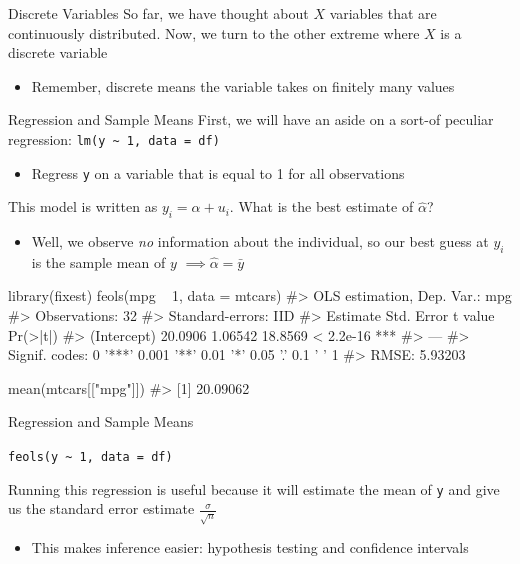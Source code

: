 \documentclass[aspectratio=169,t,11pt,table]{beamer}
\begin{document}
\begin{frame}{Discrete Variables}
  So far, we have thought about $X$ variables that are continuously distributed. Now, we turn to the other extreme where $X$ is a discrete variable
  \begin{itemize}
    \item Remember, \alert{discrete} means the variable takes on finitely many values
  \end{itemize}
\end{frame}

\begin{frame}{Regression and Sample Means}
    First, we will have an aside on a sort-of peculiar regression: 
    \texttt{lm(y \textasciitilde{} 1, data = df)}
    \begin{itemize}
      \item Regress \texttt{y} on a variable that is equal to 1 for all observations
    \end{itemize}

    \pause
    \bigskip
    This model is written as $y_i = \alpha + u_i$. What is the best estimate of $\hat{\alpha}$?
    \begin{itemize}
      \item Well, we observe \emph{no} information about the individual, so our best guess at $y_i$ is the sample mean of $y$ $\implies \hat{\alpha} = \bar{y}$
    \end{itemize} 
\end{frame}

\begin{frame}[fragile]{}
  \begin{codeblock}
library(fixest)
feols(mpg ~ 1, data = mtcars)
#> OLS estimation, Dep. Var.: mpg
#> Observations: 32
#> Standard-errors: IID 
#>             Estimate Std. Error t value  Pr(>|t|)    
#> (Intercept)  20.0906    1.06542 18.8569 < 2.2e-16 ***
#> ---
#> Signif. codes:  0 '***' 0.001 '**' 0.01 '*' 0.05 '.' 0.1 ' ' 1
#> RMSE: 5.93203

mean(mtcars[["mpg"]])
#> [1] 20.09062
  \end{codeblock}
\end{frame}

\begin{frame}{Regression and Sample Means}
  \begin{center}
    \texttt{feols(y \textasciitilde{} 1, data = df)}
  \end{center}

  \bigskip
  Running this regression is useful because it will estimate the mean of \texttt{y} and give us the standard error estimate $\frac{\sigma}{\sqrt{n}}$
  \begin{itemize}
    \item This makes inference easier: hypothesis testing and confidence intervals 
  \end{itemize}
\end{frame}
\end{document}

